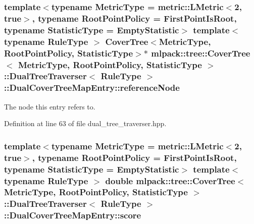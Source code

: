 \subsubsection[{reference\-Node}]{\setlength{\rightskip}{0pt plus 5cm}template$<$typename Metric\-Type  = metric\-::\-L\-Metric$<$2, true$>$, typename Root\-Point\-Policy  = First\-Point\-Is\-Root, typename Statistic\-Type  = Empty\-Statistic$>$ template$<$typename Rule\-Type $>$ {\bf Cover\-Tree}$<$Metric\-Type, Root\-Point\-Policy, Statistic\-Type$>$$\ast$ {\bf mlpack\-::tree\-::\-Cover\-Tree}$<$ Metric\-Type, Root\-Point\-Policy, Statistic\-Type $>$\-::{\bf Dual\-Tree\-Traverser}$<$ Rule\-Type $>$\-::Dual\-Cover\-Tree\-Map\-Entry\-::reference\-Node}\label{structmlpack_1_1tree_1_1CoverTree_1_1DualTreeTraverser_1_1DualCoverTreeMapEntry_af521eda77774ce95c4751da1fdecbeef}


The node this entry refers to. 



Definition at line 63 of file dual\-\_\-tree\-\_\-traverser.\-hpp.

\subsubsection[{score}]{\setlength{\rightskip}{0pt plus 5cm}template$<$typename Metric\-Type  = metric\-::\-L\-Metric$<$2, true$>$, typename Root\-Point\-Policy  = First\-Point\-Is\-Root, typename Statistic\-Type  = Empty\-Statistic$>$ template$<$typename Rule\-Type $>$ double {\bf mlpack\-::tree\-::\-Cover\-Tree}$<$ Metric\-Type, Root\-Point\-Policy, Statistic\-Type $>$\-::{\bf Dual\-Tree\-Traverser}$<$ Rule\-Type $>$\-::Dual\-Cover\-Tree\-Map\-Entry\-::score}\label{structmlpack_1_1tree_1_1CoverTree_1_1DualTreeTraverser_1_1DualCoverTreeMapEntry_a299adf2099dce070b9fbc1b61bac4604}


